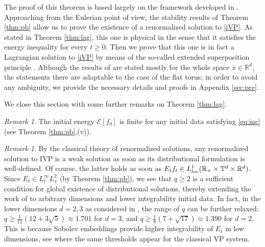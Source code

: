 \documentclass[11pt,reqno,a4paper]{amsart}
\newcommand{\R}{\mathbb{R}}
\theoremstyle{definition}
\theoremstyle{remark}
\newtheorem{remark}[lemma]{Remark}
\numberwithin{equation}{section}
\newcommand{\T} {\mathbb T}
\newcommand{\calE}{\mathcal E}
\begin{document}
The proof of this theorem is based largely on the framework developed in \cite{dipernalions1989a}. Approaching from the Eulerian point of view, the stability results of Theorem \ref{thm:pb} allow us to prove the existence of a renormalized solution to \eqref{iVP}. As stated in Theorem \ref{thm:lag}, this one is physical in the sense that it satisfies the energy inequality for every $t\ge 0$. Then we prove that this one is in fact a Lagrangian solution to \eqref{iVP} by means of the so-called extended superposition principle \cite[Theorem 4.10]{ambrosiocolombofigalli2017}. Although the results of \cite{ambrosiocolombofigalli2017} are stated mostly for the whole space $x\in \R^d$, the statements there are adaptable to the case of the flat torus; in order to avoid any ambiguity, we provide the necessary details and proofs in Appendix \ref{sec:pre}.

We close this section with some further remarks on Theorem \ref{thm:lag}.

\begin{remark}
 The initial energy $\calE[f_0]$ is finite for any initial data satisfying \eqref{eq:inc} (see Theorem \ref{thm:pb},(v)). 
\end{remark}
 

%
%
%
%
%


\begin{remark}
    By the classical theory of renormalized solutions, any renormalized solution to IVP is a weak solution as soon as its distributional formulation is well-defined. Of course, the latter holds as soon as $E_t f_t \in L^1_{\rm loc}(\R_+\times \T^d \times \R^d)$. Since $E_t \in L^\infty_tL^2_x$ (by Theorem \ref{thm:pb}), we see that $q \ge 2$ is a sufficient condition for global existence of distributional solutions, thereby extending the work of \cite{griffinpickeringiacobelli2021Torus} to arbitrary dimensions and lower integrability initial data. In fact, in the lower dimensions $d=2,3$ as considered in \cite{griffinpickeringiacobelli2021Torus}, the range of $q$ can be further relaxed: $q \ge \tfrac{1}{11}(12+3\sqrt{5}) \approx 1.701$ for $d=3$, and $q \ge \frac{1}{8}(7+\sqrt{17})\approx 1.390$ for $d=2$. This is because Sobolev embeddings provide higher integrability of $E_t$ in low dimensions, see \cite{dipernalions1988, dipernalions1988b} where the same thresholds appear for the classical VP system. 
  
\end{remark}
\end{document}
